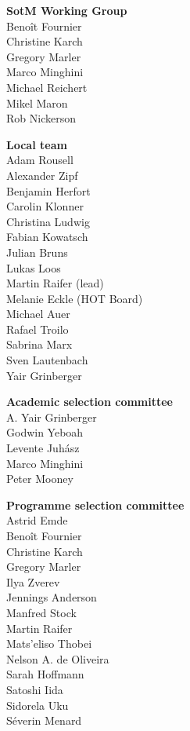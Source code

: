 \newlength{\volunteerSpace}
\setlength{}
\RaggedRight
\begin{multicols}{2}
  \begin{small}
    \textbf{SotM Working Group}\\
    Benoît Fournier\\
    Christine Karch\\
    Gregory Marler\\
    Marco Minghini\\
    Michael Reichert\\
    Mikel Maron\\
    Rob Nickerson

    \vspace{\volunteerSpace}
    \textbf{Local team}\\
    Adam Rousell\\
    Alexander Zipf\\
    Benjamin Herfort\\
    Carolin Klonner\\
    Christina Ludwig\\
    Fabian Kowatsch\\
    Julian Bruns\\
    Lukas Loos\\
    Martin Raifer (lead)\\
    Melanie Eckle (HOT Board)\\
    Michael Auer\\
    Rafael Troilo\\
    Sabrina Marx\\
    Sven Lautenbach\\
    Yair Grinberger

    \vspace{\volunteerSpace}
    \textbf{Academic selection committee}\\
    A. Yair Grinberger\\
    Godwin Yeboah\\
    Levente Juhász\\
    Marco Minghini\\
    Peter Mooney

    \vspace{\volunteerSpace}
    \textbf{Programme selection \mbox{committee}}\\
    Astrid Emde\\
    Benoît Fournier\\
    Christine Karch\\
    Gregory Marler\\
    Ilya Zverev\\
    Jennings Anderson\\
    Manfred Stock\\
    Martin Raifer\\
    Mats'eliso Thobei\\
    Nelson A. de Oliveira\\
    Sarah Hoffmann\\
    Satoshi Iida\\
    Sidorela Uku\\
    Séverin Menard


\end{small}
\end{multicols}
